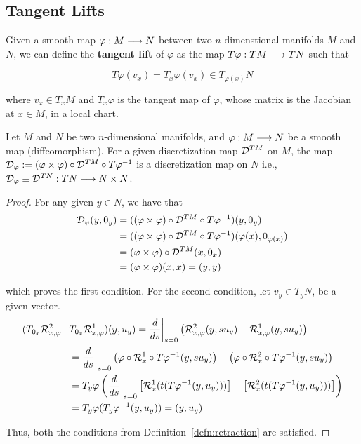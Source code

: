 \subsection{Tangent Lifts}

Given a smooth map $\varphi: M \longrightarrow N$ between two $n$-dimenstional manifolds $M$ and $N$, we can define the \textbf{tangent lift} of $\varphi$ as the map $T\varphi: TM \longrightarrow TN$ such that

\[
  T\varphi(v_x) = T_x \varphi(v_x) \in T_{\varphi(x)} N
\]

where $v_x \in T_x M$ and $T_x\varphi$ is the tangent map of $\varphi$, whose matrix is the Jacobian at $x \in M$, in a local chart.

\begin{prop}
  \label{prop:retr-lift}
Let $M$ and $N$ be two $n$-dimensional manifolds, and $\varphi: M \longrightarrow N$ be a smooth map (diffeomorphism). For a given discretization map $\mathcal{D}^{TM}$ on $M$, the map $\mathcal{D}_{\varphi} :=  (\varphi \times \varphi) \circ \mathcal{D}^{TM} \circ T \varphi ^{-1}$ is a discretization map on $N$ i.e., $\mathcal{D}_{\varphi} \equiv \mathcal{D}^{TN} : TN \longrightarrow N \times N$.
\end{prop}


\begin{proof}
  For any given $y \in N$, we have that 
  \begin{equation*}
    \begin{split}
      \mathcal{D}_{\varphi} (y, 0_y) &= ((\varphi \times \varphi) \circ \mathcal{D}^{TM} \circ T\varphi^{-1}) (y, 0_y) \\
      &= ((\varphi \times \varphi) \circ \mathcal{D}^{TM} \circ T\varphi^{-1}) (\varphi(x), 0_{\varphi(x)}) \\
      &= (\varphi \times \varphi) \circ \mathcal{D}^{TM} (x, 0_x) \\ 
      &= (\varphi \times \varphi) (x, x) = (y, y)
    \end{split}
  \end{equation*}

  which proves the first condition. For the second condition, let $v_y \in T_y N$, be a given vector.
  \begin{equation*}
    \begin{split}
      (T_{0_x} \mathcal{R}_{x, \varphi}^2 - & T_{0_x} \mathcal{R}_{x, \varphi}^1 )(y, u_y) = \dfrac{d}{ds} \bigg{|}_{s=0} \left( \mathcal{R}_{x, \varphi}^2 (y, su_y) - \mathcal{R}_{x, \varphi}^1 (y, su_y) \right) \\
      &= \dfrac{d}{ds} \bigg{|}_{s=0} \left(\varphi \circ \mathcal{R}^1_x \circ T\varphi^{-1} (y, su_y) \right) -  \left( \varphi \circ \mathcal{R}^2_x \circ T \varphi^{-1}(y, su_y) \right) \\
      &= T_y \varphi \left( \dfrac{d}{ds} \bigg{|}_{s=0} \left[ \mathcal{R}^1_x(t(T\varphi^{-1} (y, u_y))) \right] - \left[ \mathcal{R}^2_x(t(T\varphi^{-1} (y, u_y))) \right] \right) \\
      &= T_y \varphi (T_y \varphi^{-1} (y, u_y)) = (y, u_y)
    \end{split}
  \end{equation*}

Thus, both the conditions from Definition~\ref{defn:retraction} are satisfied.
\end{proof}

